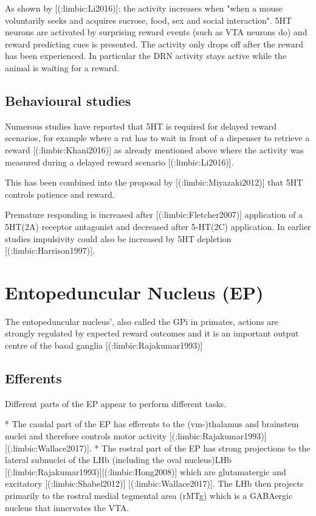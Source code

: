 {{As shown by [(:limbic:Li2016)]: the activity increases when "when a mouse voluntarily seeks and acquires sucrose, food, sex and social interaction". 5HT neurons are activated by surprising reward events (such as VTA neurons do) and reward predicting cues is presented. The activity only drops off after the reward has been experienced. In particular the DRN activity stays active while the animal is waiting for a reward.

\subsection{Behavioural studies}

Numerous studies have reported that 5HT is required for delayed reward scenarios, for example where a rat has to wait in front of a dispenser to retrieve a reward [(:limbic:Khani2016)] as already mentioned above where the activity was measured during a delayed reward scenario [(:limbic:Li2016)].

This has been combined into the proposal by [(:limbic:Miyazaki2012)] that 5HT controls patience and reward.

Premature responding is increased after [(:limbic:Fletcher2007)] application of a 5HT(2A) receptor antagonist and decreased after 5-HT(2C) application. In earlier studies impulsivity could also be increased by 5HT depletion [(:limbic:Harrison1997)].







\section{Entopeduncular Nucleus (EP)}

The entopeduncular nucleus’, also called the GPi in primates, actions are
strongly regulated by expected reward outcomes and it is an important output centre of the basal ganglia [(:limbic:Rajakumar1993)] 

\subsection{Efferents}

Different parts of the EP appear to perform different tasks. 

  * The caudal part of the EP has efferents to the (vm-)thalamus and brainstem nuclei and therefore controls motor activity [(:limbic:Rajakumar1993)]  [(:limbic:Wallace2017)].
  * The rostral part of the EP has strong projections to the lateral subnuclei of the LHb (including the oval nucleus)LHb [(:limbic:Rajakumar1993)][(:limbic:Hong2008)] which are glutamatergic and excitatory [(:limbic:Shabel2012)] [(:limbic:Wallace2017)]. The LHb then projects primarily to the rostral medial tegmental area (rMTg) which is a GABAergic nucleus that innervates the VTA.

}}
